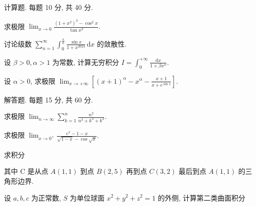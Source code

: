 \par{}
计算题. 每题 10 分, 共 40 分.\par
求极限 $\lim_{x\to 0}\frac{(1 + x^2)^3 - \cos^2x}{\tan x^2}.$\par
讨论级数 $\sum_{n=1}^{\infty} \int_{0}^{\frac{\pi}{n}} \frac{\sin x}{1 + x^{2024}} \, \mathrm{d}x$ 的敛散性.\par
设 $\beta > 0, \alpha > 1$ 为常数, 计算无穷积分 $I = \int_{0}^{+\infty} \frac{\mathrm{d}x}{1 + \beta x^{\alpha}}$.\par
设 $\alpha > 0$, 求极限 $\lim_{x \to +\infty} \left[ (x + 1)^{\alpha} - x^{\alpha} - \frac{x + 1}{x + e^{\sin x}} \right]$.\par
\par{}
解答题. 每题 15 分, 共 60 分.\par
求极限 $\lim_{n\to \infty}\sum_{k = 1}^{n}\frac{n^2}{n^3 + k^3 + k^2}.$\par
求极限 $\lim_{x\to 0^{+}}\frac{e^{x} - 1 - x}{\sqrt{1 - x} - \cos\sqrt{x}}.$\par
\par{}
求积分\par
\nopagebreak[4]
其中 C 是从点  $A(1,1)$  到点  $B(2,5)$  再到点  $C(3,2)$  最后到点  $A(1,1)$  的三角形边界.\par
\par{}
设 $a, b, c$ 为正常数, $S$ 为单位球面 $x^{2} + y^{2} + z^{2} = 1$ 的外侧, 计算第二类曲面积分\par
